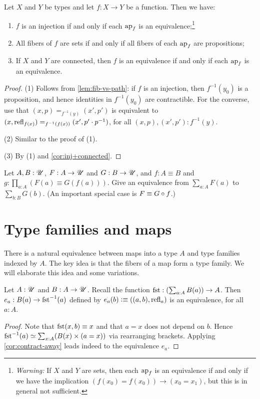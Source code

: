 \begin{corollary}\label{cor:fib-vs-path}\label{lem:eqandcovofconntypes}
Let $X$ and $Y$ be types and let $f:X\to Y$ be a function. Then we have:
\begin{enumerate}
\item\label{prop-fib-vs-path} 
  $f$ is an injection if and only if each $\ap{f}$ is an equivalence;\footnote{%
    \emph{Warning:}
    If $X$ and $Y$ are sets, then each $\ap{f}$ is an equivalence
    if and only if we have the implication $(f(x_0) = f(x_0)) \to (x_0 = x_1)$,
    but this is in general not sufficient.}
\item\label{set-fib-vs-path} 
All fibers of $f$ are sets if and only if all fibers of each $\ap{f}$ are propositions;
\item\label{conn-fib-vs-path} 
If $X$ and $Y$ are connected, then $f$ is an equivalence 
if and only if each $\ap{f}$ is an equivalence.
\end{enumerate}
\end{corollary}
\begin{proof}
(1) Follows from \cref{lem:fib-vs-path}: if $f$ is an injection,
then $f^{-1}(y_0)$ is a proposition, and hence identities in $f^{-1}(y_0)$
are contractible. For the converse, use that $(x,p)=_{f^{-1}(y)}(x',p')$ is
equivalent to $(x,\mathrm{refl}_{f(x)}) =_{f^{-1}(f(x))} (x',p'\cdot p^{-1})$, 
for all $(x,p),(x',p') : f^{-1}(y)$.

(2) Similar to the proof of (1).

(3) By (1) and \cref{cor:inj+connected}.
\end{proof}

\begin{xca}\label{xca:sum-equivalences}
Let $A,B:{\mathscr{U}}$, $F:A\to{\mathscr{U}}$ and $G:B\to{\mathscr{U}}$,
and $f: A\equiv B$ and $g:\prod_{a:A}(F(a) \equiv G(f(a)))$.
Give an equivalence from $\sum_{a:A} F(a)$ to $\sum_{b:B} G(b)$.
(An important special case is $F\jdeq G\circ f$.) 
\end{xca}

\section{Type families and maps}
\label{sec:typefam}

There is a natural equivalence between maps into a type $A$
and type families indexed by $A$. The key idea is that the
fibers of a map form a type family. We will elaborate this
idea and some variations.


\begin{lemma}\label{lem:fst-fiber(a)=B(a)}
Let $A:{\mathscr{U}}$ and $B:A\to{\mathscr{U}}$.
Recall the function $\fst: (\sum_{a:A} B(a))\to A$.
Then $e_a: B(a) \to \fst^{-1}(a)$ defined by 
$e_a(b)\defeq ((a,b),\refl{a})$ is an equivalence,
for all $a:A$.
\end{lemma}
\begin{proof}
Note that $\fst(x,b)\jdeq x$ and that $a=x$ does
not depend on $b$. Hence
$\fst^{-1}(a) \equiv \sum_{x:A}  (B(x) \times (a=x))$
via rearranging brackets.
Applying \cref{cor:contract-away} leads indeed to 
the equivalence $e_a$. 
\end{proof}

